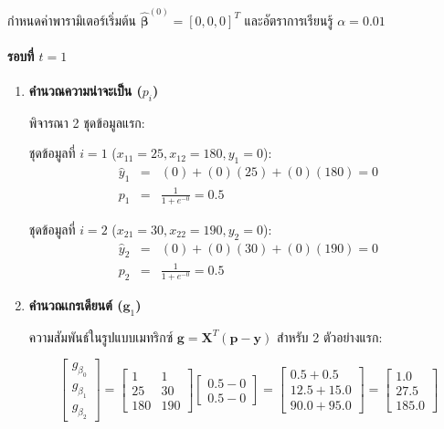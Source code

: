 กำหนดค่าพารามิเตอร์เริ่มต้น $\hat{\boldsymbol{\beta}}^{(0)} = [0, 0, 0]^T$ และอัตราการเรียนรู้ $\alpha = 0.01$

\paragraph{รอบที่ $t = 1$}
\begin{enumerate}
    \item \textbf{คำนวณความน่าจะเป็น ($p_i$)} 
    
    พิจารณา 2 ชุดข้อมูลแรก:
    
    ชุดข้อมูลที่ $i=1$ ($x_{11} = 25, x_{12} = 180, y_1 = 0$):
    \begin{eqnarray} \nonumber
        \hat{y}_1 &=& (0) + (0)(25) + (0)(180) = 0 \\ \nonumber
        p_1 &=& \frac{1}{1 + e^{-0}} = 0.5
    \end{eqnarray}
    
    ชุดข้อมูลที่ $i=2$ ($x_{21} = 30, x_{22} = 190, y_2 = 0$):
    \begin{eqnarray} \nonumber
        \hat{y}_2 &=& (0) + (0)(30) + (0)(190) = 0 \\ \nonumber
        p_2 &=& \frac{1}{1 + e^{-0}} = 0.5
    \end{eqnarray}
    
    \item \textbf{คำนวณเกรเดียนต์ ($\mathbf{g}_1$)} 
    
    ความสัมพันธ์ในรูปแบบเมทริกซ์ $\mathbf{g} = \mathbf{X}^T(\mathbf{p} - \mathbf{y})$ สำหรับ 2 ตัวอย่างแรก:
    
    $$ \begin{bmatrix} g_{\beta_0} \\ g_{\beta_1} \\ g_{\beta_2} \end{bmatrix} = \begin{bmatrix} 1 & 1 \\ 25 & 30 \\ 180 & 190 \end{bmatrix} \begin{bmatrix} 0.5 - 0 \\ 0.5 - 0 \end{bmatrix} = \begin{bmatrix} 0.5 + 0.5 \\ 12.5 + 15.0 \\ 90.0 + 95.0 \end{bmatrix} = \begin{bmatrix} 1.0 \\ 27.5 \\ 185.0 \end{bmatrix} $$
    

\end{enumerate}
